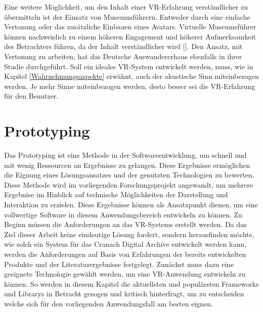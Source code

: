 \documentclass[a4paper,12pt,oneside]{article}
\begin{document}
        Eine weitere Möglichkeit, um den Inhalt einer VR-Erfahrung verständlicher zu übermitteln
        ist der Einsatz von Museumsführern. Entweder durch eine einfache Vertonung 
        oder das zusätzliche Einbauen eines Avatars. 
        Virtuelle Museumsführer können nachweislich zu einem höheren
        Engagement und höherer Aufmerksamkeit des Betrachters führen, da der Inhalt
        verständlicher wird [\cite[299-300]{Carrozzino2018}].
        Den Ansatz, mit Vertonung zu arbeiten, hat das Deutsche Auswandererhaus ebenfalls in
        ihrer Studie durchgeführt.
        Soll ein ideales VR-System entwickelt werden, muss, wie in Kapitel \ref{Wahrnehmungsaspekte}
        erwähnt, auch der akustische Sinn miteinbezogen werden. Je mehr Sinne miteinbezogen
        werden, desto besser sei die VR-Erfahrung für den Benutzer.
  \section{Prototyping}
    Das Prototyping ist eine Methode in der Softwareentwicklung, um schnell und mit 
    wenig Ressourcen an Ergebnisse zu gelangen. Diese Ergebnisse ermöglichen die
    Eignung eines Lösungsansatzes und der genutzten Technologien zu bewerten. \\
    Diese Methode wird im vorliegenden Forschungsprojekt angewandt, um mehrere Ergebnise im
    Hinblick auf technische Möglichkeiten der Darstellung und Interaktion zu erzielen.
    Diese Ergebnisse können als Ansatzpunkt dienen, um eine vollwertige Software 
    in diesem Anwendungsbereich entwickeln zu können.
    Zu Beginn müssen die Anforderungen an das VR-Systems erstellt werden. Da
    das Ziel dieser Arbeit keine eindeutige Lösung fordert, sondern herausfinden möchte,
    wie solch ein System für das Cranach Digital Archive entwickelt werden kann, werden
    die Anforderungen auf Basis von Erfahrungen der bereits entwickelten Produkte und der 
    Literaturergebnisse festgelegt.
    Zunächst muss dazu eine geeignete Technologie
    gewählt werden, um eine VR-Anwendung entwickeln zu können. So werden in diesem Kapitel
    die aktuellsten und populärsten Frameworks und Librarys in Betracht gezogen und kritisch
    hinterfragt, um zu entscheiden welche sich für den 
    vorliegenden Anwendungsfall am besten eignen.
\end{document}
